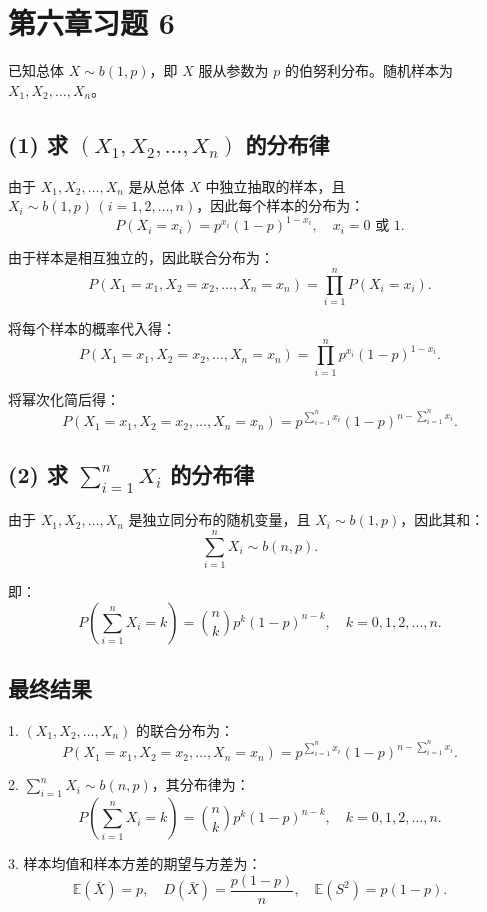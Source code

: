 \documentclass[twoside]{article}
\begin{document}
\section{第六章习题 6}
\begin{ans}{6}{6}

    已知总体 \( X \sim b(1, p) \)，即 \( X \) 服从参数为 \( p \) 的伯努利分布。随机样本为 \( X_1, X_2, \dots, X_n \)。

\subsection*{(1) 求 \( (X_1, X_2, \dots, X_n) \) 的分布律}

由于 \( X_1, X_2, \dots, X_n \) 是从总体 \( X \) 中独立抽取的样本，且 \( X_i \sim b(1, p) \, (i = 1, 2, \dots, n) \)，因此每个样本的分布为：
\[
P(X_i = x_i) = p^{x_i}(1 - p)^{1 - x_i}, \quad x_i = 0 \text{ 或 } 1.
\]

由于样本是相互独立的，因此联合分布为：
\[
P(X_1 = x_1, X_2 = x_2, \dots, X_n = x_n) = \prod_{i=1}^n P(X_i = x_i).
\]

将每个样本的概率代入得：
\[
P(X_1 = x_1, X_2 = x_2, \dots, X_n = x_n) = \prod_{i=1}^n p^{x_i}(1 - p)^{1 - x_i}.
\]

将幂次化简后得：
\[
P(X_1 = x_1, X_2 = x_2, \dots, X_n = x_n) = p^{\sum_{i=1}^n x_i}(1 - p)^{n - \sum_{i=1}^n x_i}.
\]

\subsection*{(2) 求 \( \sum_{i=1}^n X_i \) 的分布律}

由于 \( X_1, X_2, \dots, X_n \) 是独立同分布的随机变量，且 \( X_i \sim b(1, p) \)，因此其和：
\[
\sum_{i=1}^n X_i \sim b(n, p).
\]

即：
\[
P\left(\sum_{i=1}^n X_i = k\right) = \binom{n}{k} p^k (1 - p)^{n - k}, \quad k = 0, 1, 2, \dots, n.
\]

\subsection*{最终结果}

1. \( (X_1, X_2, \dots, X_n) \) 的联合分布为：
\[
P(X_1 = x_1, X_2 = x_2, \dots, X_n = x_n) = p^{\sum_{i=1}^n x_i}(1 - p)^{n - \sum_{i=1}^n x_i}.
\]

2. \( \sum_{i=1}^n X_i \sim b(n, p) \)，其分布律为：
\[
P\left(\sum_{i=1}^n X_i = k\right) = \binom{n}{k} p^k (1 - p)^{n - k}, \quad k = 0, 1, 2, \dots, n.
\]

3. 样本均值和样本方差的期望与方差为：
\[
\mathbb{E}(\bar{X}) = p, \quad D(\bar{X}) = \frac{p(1 - p)}{n}, \quad \mathbb{E}(S^2) = p(1 - p).
\]

\end{ans}
\end{document}
